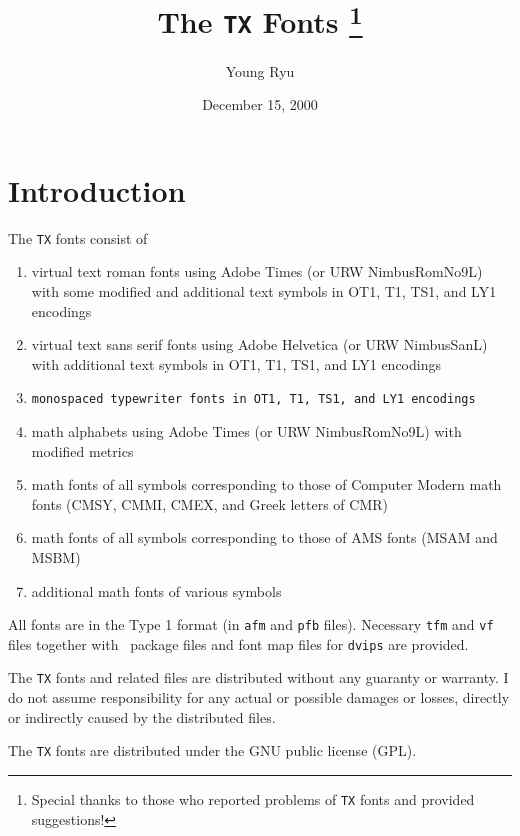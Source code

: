 \documentclass[11pt]{article}
\begin{document}
\title{The \texttt{TX} Fonts%
\thanks{Special thanks to those who reported problems of
\texttt{TX} fonts and provided suggestions!}}

\author{Young Ryu}

\date{December 15, 2000}

\maketitle

\tableofcontents

\clearpage
\section{Introduction}

The \texttt{TX} fonts consist of
\begin{enumerate}\itemsep=0pt
\item virtual text roman fonts using Adobe Times (or URW NimbusRomNo9L) with
      some modified and additional text symbols in OT1, T1, TS1, and LY1 encodings
\item \textsf{virtual text sans serif fonts using Adobe Helvetica (or URW NimbusSanL) with
      additional text symbols in OT1, T1, TS1, and LY1 encodings}
\item \texttt{monospaced typewriter fonts in OT1, T1, TS1, and LY1 encodings}
\item math alphabets using Adobe Times (or URW NimbusRomNo9L)
      with modified metrics
\item math fonts of all symbols corresponding to those of Computer Modern
      math fonts (CMSY, CMMI, CMEX, and Greek letters of CMR)
\item math fonts of all symbols corresponding to those of AMS fonts
      (MSAM and MSBM)
\item additional math fonts of various symbols
\end{enumerate}
%
All fonts are in the Type 1 format (in \texttt{afm} and \texttt{pfb} files).
Necessary \texttt{tfm} and \texttt{vf} files together with
\LaTeXe\ package files and font map files for \texttt{dvips} are
provided.

\begin{bfseries}%
The \texttt{TX} fonts and related files are distributed 
without any guaranty or warranty.
I do not assume responsibility for any actual or possible
damages or losses, directly or indirectly caused by the
distributed files.
\end{bfseries}
The \texttt{TX} fonts are distributed under the GNU public license (GPL)\@.
\end{document}
